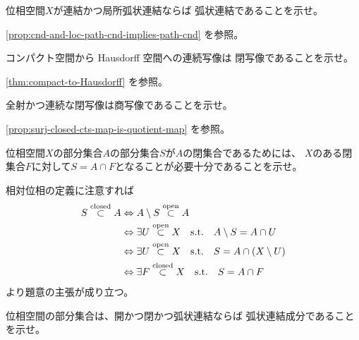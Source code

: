 \documentclass[report]{jlreq}
\begin{document}
\begin{problem}[幾何学II 2.6]
    位相空間$X$が連結かつ局所弧状連結ならば
    弧状連結であることを示せ。
\end{problem}

\begin{answer}
    \cref{prop:cnd-and-loc-path-cnd-implies-path-cnd} を参照。
\end{answer}

\begin{problem}[幾何学II 2.7]
    コンパクト空間から Hausdorff 空間への連続写像は
    閉写像であることを示せ。
\end{problem}

\begin{answer}
    \cref{thm:compact-to-Hausdorff} を参照。
\end{answer}

\begin{problem}[幾何学II 2.8]
    全射かつ連続な閉写像は商写像であることを示せ。
\end{problem}

\begin{answer}
    \cref{prop:surj-closed-cts-map-is-quotient-map} を参照。
\end{answer}

\begin{problem}[幾何学II 2.9]
    位相空間$X$の部分集合$A$の部分集合$S$が$A$の閉集合であるためには、
    $X$のある閉集合$F$に対して$S = A \cap F$となることが必要十分であることを示せ。
\end{problem}

\begin{answer}
    相対位相の定義に注意すれば
    \begin{alignat}{1}
        S \stackrel{\text{closed}}{\subset} A
            &\Leftrightarrow A \setminus S \stackrel{\text{open}}{\subset} A \\
            &\Leftrightarrow
                \exists U \stackrel{\text{open}}{\subset} X \quad \text{s.t.} \quad
                A \setminus S = A \cap U \\
            &\Leftrightarrow
                \exists U \stackrel{\text{open}}{\subset} X \quad \text{s.t.} \quad
                S = A \cap (X \setminus U) \\
            &\Leftrightarrow
                \exists F \stackrel{\text{closed}}{\subset} X \quad \text{s.t.} \quad
                S = A \cap F
    \end{alignat}
    より題意の主張が成り立つ。
\end{answer}

\begin{problem}[幾何学II 2.10]
    位相空間の部分集合は、開かつ閉かつ弧状連結ならば
    弧状連結成分であることを示せ。
\end{problem}
\end{document}
